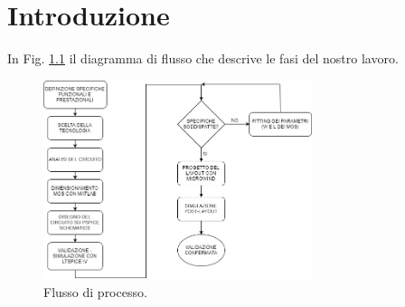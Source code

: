 
\chapter{Introduzione} %
\label{Chapter1} 

In Fig. \ref{fig:workflow} il diagramma di flusso che descrive le fasi del nostro lavoro.

\begin{figure}[hbt!]
	\centering
	\includegraphics[width=0.7\textwidth]{figure/Workflow.jpg}
	\caption{Flusso di processo.}
	\label{fig:workflow}
\end{figure}









